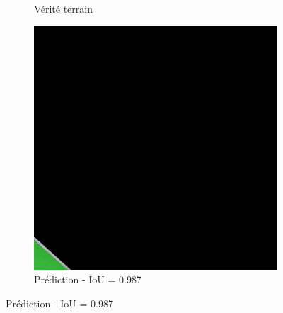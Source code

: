 \begin{figure}[H]
\begin{subfigure}{0.32\textwidth}
    \caption{Vérité terrain}
\end{subfigure}
\hfill
\begin{subfigure}{0.32\textwidth}
    \includegraphics[width=\textwidth]{02-main//figures/ch4/kfold_ensembles/upernet_tu-efficientnetv2_rw_s.ra2_in1k/best_cases/best_3_iou0.987_24941121_tile_16_8_fd3555_overlay_pred.png}
    \caption{Prédiction - IoU = 0.987}
\end{subfigure}

\vspace{0.35cm}


\end{figure}
